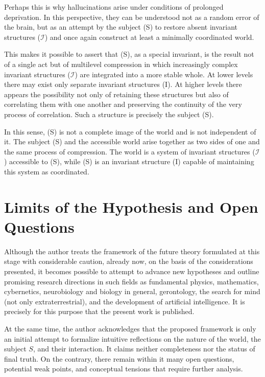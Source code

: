 \documentclass[aps,prd,onecolumn,nofootinbib,superscriptaddress]{revtex4-2} %
\begin{document}
    Perhaps this is why hallucinations arise under conditions of prolonged deprivation. In this perspective, they can be understood not as a random error of the brain, but as an attempt by the subject (S) to restore absent invariant structures ($\mathcal{I}$) and once again construct at least a minimally coordinated world.

    This makes it possible to assert that (S), as a special invariant, is the result not of a single act but of multilevel compression in which increasingly complex invariant structures ($\mathcal{I}$) are integrated into a more stable whole. At lower levels there may exist only separate invariant structures (I). At higher levels there appears the possibility not only of retaining these structures but also of correlating them with one another and preserving the continuity of the very process of correlation. Such a structure is precisely the subject (S).

    In this sense, (S) is not a complete image of the world and is not independent of it. The subject (S) and the accessible world arise together as two sides of one and the same process of compression. The world is a system of invariant structures ($\mathcal{I}$) accessible to (S), while (S) is an invariant structure (I) capable of maintaining this system as coordinated.


    \section{Limits of the Hypothesis and Open Questions}

    Although the author treats the framework of the future theory formulated at this stage with considerable caution, already now, on the basis of the considerations presented, it becomes possible to attempt to advance new hypotheses and outline promising research directions in such fields as fundamental physics, mathematics, cybernetics, neurobiology and biology in general, gerontology, the search for mind (not only extraterrestrial), and the development of artificial intelligence. It is precisely for this purpose that the present work is published.

    At the same time, the author acknowledges that the proposed framework is only an initial attempt to formalize intuitive reflections on the nature of the world, the subject \(S\), and their interaction. It claims neither completeness nor the status of final truth. On the contrary, there remain within it many open questions, potential weak points, and conceptual tensions that require further analysis.
\end{document}
